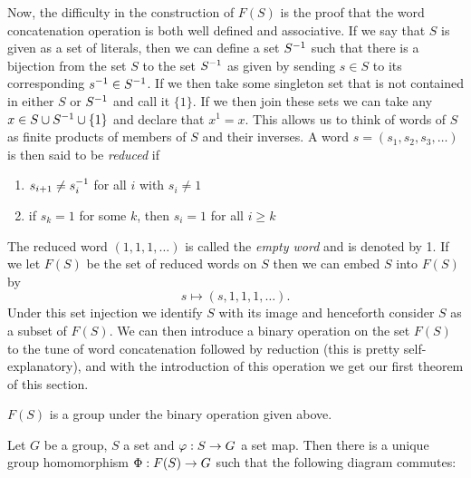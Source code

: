\begin{center}
\end{center}

Now, the difficulty in the construction of $F(S)$ is the proof that the word concatenation operation is both well defined and associative. If we say that $S$ is given as a set of literals, then we can define a set $S^{-1}$ such that there is a bijection from the set $S$ to the set $S^{-1}$ as given by sending $s\in S$ to its corresponding $s^{-1} \in S^{-1}$. If we then take some singleton set that is not contained in either $S$ or $S^{-1}$ and call it $\{1\}$. If we then join these sets we can take any $x\in S\cup S^{-1}\cup\{1\}$ and declare that $x^1 = x$. This allows us to think of words of $S$ as finite products of members of $S$ and their inverses. A word $s = (s_1,s_2,s_3,\ldots)$ is then said to be \textit{reduced} if 
\begin{enumerate}
\item $s_{i + 1} \neq s_i^{-1}$ for all $i$ with $s_i\neq 1$
\item if $s_k = 1$ for some $k$, then $s_i = 1$ for all $i\geq k$
\end{enumerate}

The reduced word $(1,1,1,\ldots)$ is called the \textit{empty word} and is denoted by 1. If we let $F(S)$ be the set of reduced words on $S$ then we can embed $S$ into $F(S)$ by 
\[s\mapsto (s,1,1,1,\ldots ).\]
Under this set injection we identify $S$ with its image and henceforth consider $S$ as a subset of $F(S)$. We can then introduce a binary operation on the set $F(S)$ to the tune of word concatenation followed by reduction (this is pretty self-explanatory), and with the introduction of this operation we get our first theorem of this section.

\nl

\begin{thm}
$F(S)$ is a group under the binary operation given above.
\end{thm}

\nl

\begin{thm}
Let $G$ be a group, $S$ a set and $\varphi:S\rightarrow G$ a set map. Then there is a unique group homomorphism $\Phi:F(S)\rightarrow G$ such that the following diagram commutes:
\begin{center}
\end{center}
\end{thm}

